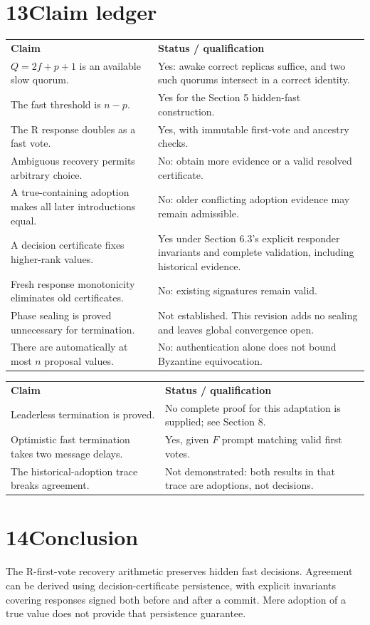 \documentclass[11pt,a4paper]{article}
\newcommand{\page}[1]{\clearpage\setcounter{page}{#1}}
\begin{document}
\section*{13\quad Claim ledger}
\begin{tabular}{p{}p{}}
\textbf{Claim} & \textbf{Status / qualification}\\[6pt]
$Q=2f+p+1$ is an available slow quorum. & Yes: awake correct replicas suffice, and two such quorums intersect in a correct identity.\\[6pt]
The fast threshold is $n-p$. & Yes for the Section 5 hidden-fast construction.\\[6pt]
The R response doubles as a fast vote. & Yes, with immutable first-vote and ancestry checks.\\[6pt]
Ambiguous recovery permits arbitrary choice. & No: obtain more evidence or a valid resolved certificate.\\[6pt]
A true-containing adoption makes all later introductions equal. & No: older conflicting adoption evidence may remain admissible.\\[6pt]
A decision certificate fixes higher-rank values. & Yes under Section 6.3's explicit responder invariants and complete validation, including historical evidence.\\[6pt]
Fresh response monotonicity eliminates old certificates. & No: existing signatures remain valid.\\[6pt]
Phase sealing is proved unnecessary for termination. & Not established. This revision adds no sealing and leaves global convergence open.\\[6pt]
There are automatically at most $n$ proposal values. & No: authentication alone does not bound Byzantine equivocation.
\end{tabular}
\page{16}
\begin{tabular}{p{}p{}}
\textbf{Claim} & \textbf{Status / qualification}\\[6pt]
Leaderless termination is proved. & No complete proof for this adaptation is supplied; see Section 8.\\[6pt]
Optimistic fast termination takes two message delays. & Yes, given $F$ prompt matching valid first votes.\\[6pt]
The historical-adoption trace breaks agreement. & Not demonstrated: both results in that trace are adoptions, not decisions.
\end{tabular}
\section*{14\quad Conclusion}
The R-first-vote recovery arithmetic preserves hidden fast decisions. Agreement can be derived using decision-certificate persistence, with explicit invariants covering responses signed both before and after a commit. Mere adoption of a true value does not provide that persistence guarantee.
\end{document}
